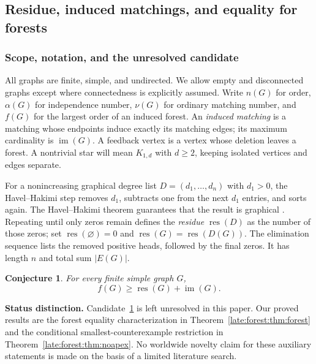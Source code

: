 \documentclass[11pt,a4paper]{article}
\newtheorem{conjecture}[theorem]{Conjecture}
\theoremstyle{definition}\newtheorem{definition}[theorem]{Definition}
\theoremstyle{remark}\newtheorem{remark}[theorem]{Remark}
\newcommand{\res}{\operatorname{res}}
\newcommand{\im}{\operatorname{im}}
\begin{document}
\subsection{Residue, induced matchings, and equality for forests}\label{late:forest}

\subsubsection{Scope, notation, and the unresolved candidate}

All graphs are finite, simple, and undirected. We allow empty and disconnected
graphs except where connectedness is explicitly assumed. Write $n(G)$ for
order, $\alpha(G)$ for independence number, $\nu(G)$ for ordinary matching
number, and $f(G)$ for the largest order of an induced forest. An
\emph{induced matching} is a matching whose endpoints induce exactly its
matching edges; its maximum cardinality is $\im(G)$. A feedback vertex is a
vertex whose deletion leaves a forest. A nontrivial star will mean $K_{1,d}$
with $d\ge2$, keeping isolated vertices and edges separate.

For a nonincreasing graphical degree list $D=(d_1,\ldots,d_n)$ with $d_1>0$,
the Havel--Hakimi step removes $d_1$, subtracts one from the next $d_1$
entries, and sorts again. The Havel--Hakimi theorem guarantees that the result
is graphical \cite{late:forest:Hakimi}. Repeating until only zeros remain defines the
\emph{residue} $\res(D)$ as the number of those zeros; set $\res(\varnothing)=0$ and
$\res(G)=\res(D(G))$. The elimination sequence lists the removed positive heads,
followed by the final zeros. It has length $n$ and total sum $|E(G)|$.

\begin{conjecture}\label{late:forest:cand}
For every finite simple graph $G$,
\begin{equation}\label{late:forest:eq:candidate}
f(G)\ge \res(G)+\im(G).
\end{equation}
\end{conjecture}

\noindent\textbf{Status distinction.}
Candidate~\ref{late:forest:cand} is left unresolved in this paper. Our proved results are the
forest equality characterization in Theorem~\ref{late:forest:thm:forest} and the
conditional smallest-counterexample restriction in
Theorem~\ref{late:forest:thm:noapex}. No worldwide novelty claim for these auxiliary
statements is made on the basis of a limited literature search.
\end{document}
